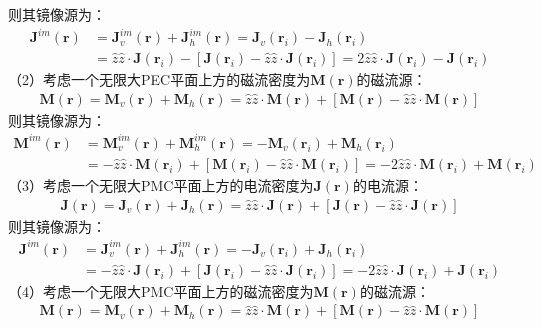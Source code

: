 \documentclass{article}
\numberwithin{equation}{section}
\renewcommand{\vec}[1]{\boldsymbol{#1}}
\begin{document}
则其镜像源为：
\begin{align}
    \label{eq:eq170}
    \mathbf{J}^{im}(\vec{r})&=\mathbf{J}^{im}_v(\vec{r})+\mathbf{J}^{im}_h(\vec{r})=\mathbf{J}_v(\vec{r}_i)-\mathbf{J}_h(\vec{r}_i) \nonumber \\
                            &=\hat{z}\hat{z}\cdot\mathbf{J}(\vec{r}_i)-[\mathbf{J}(\vec{r}_i)-\hat{z}\hat{z}\cdot\mathbf{J}(\vec{r}_i)]=2\hat{z}\hat{z}\cdot\mathbf{J}(\vec{r}_i)-\mathbf{J}(\vec{r}_i)
\end{align}
（2）考虑一个无限大PEC平面上方的磁流密度为$\mathbf{M}(\vec{r})$的磁流源：
\begin{align}
    \label{eq:eq171}
    \mathbf{M}(\vec{r})=\mathbf{M}_v(\vec{r})+\mathbf{M}_h(\vec{r})=\hat{z}\hat{z}\cdot\mathbf{M}(\vec{r})+[\mathbf{M}(\vec{r})-\hat{z}\hat{z}\cdot\mathbf{M}(\vec{r})]
\end{align}
则其镜像源为：
\begin{align}
    \label{eq:eq172}
    \mathbf{M}^{im}(\vec{r})&=\mathbf{M}^{im}_v(\vec{r})+\mathbf{M}^{im}_h(\vec{r})=-\mathbf{M}_v(\vec{r}_i)+\mathbf{M}_h(\vec{r}_i) \nonumber \\
                            &=-\hat{z}\hat{z}\cdot\mathbf{M}(\vec{r}_i)+[\mathbf{M}(\vec{r}_i)-\hat{z}\hat{z}\cdot\mathbf{M}(\vec{r}_i)]=-2\hat{z}\hat{z}\cdot\mathbf{M}(\vec{r}_i)+\mathbf{M}(\vec{r}_i)
\end{align}
（3）考虑一个无限大PMC平面上方的电流密度为$\mathbf{J}(\vec{r})$的电流源：
\begin{align}
    \label{eq:eq173}
    \mathbf{J}(\vec{r})=\mathbf{J}_v(\vec{r})+\mathbf{J}_h(\vec{r})=\hat{z}\hat{z}\cdot\mathbf{J}(\vec{r})+[\mathbf{J}(\vec{r})-\hat{z}\hat{z}\cdot\mathbf{J}(\vec{r})]
\end{align}
则其镜像源为：
\begin{align}
    \label{eq:eq174}
    \mathbf{J}^{im}(\vec{r})&=\mathbf{J}^{im}_v(\vec{r})+\mathbf{J}^{im}_h(\vec{r})=-\mathbf{J}_v(\vec{r}_i)+\mathbf{J}_h(\vec{r}_i) \nonumber \\
                            &=-\hat{z}\hat{z}\cdot\mathbf{J}(\vec{r}_i)+[\mathbf{J}(\vec{r}_i)-\hat{z}\hat{z}\cdot\mathbf{J}(\vec{r}_i)]=-2\hat{z}\hat{z}\cdot\mathbf{J}(\vec{r}_i)+\mathbf{J}(\vec{r}_i)
\end{align}
（4）考虑一个无限大PMC平面上方的磁流密度为$\mathbf{M}(\vec{r})$的磁流源：
\begin{align}
    \label{eq:eq175}
    \mathbf{M}(\vec{r})=\mathbf{M}_v(\vec{r})+\mathbf{M}_h(\vec{r})=\hat{z}\hat{z}\cdot\mathbf{M}(\vec{r})+[\mathbf{M}(\vec{r})-\hat{z}\hat{z}\cdot\mathbf{M}(\vec{r})]
\end{align}
\end{document}

